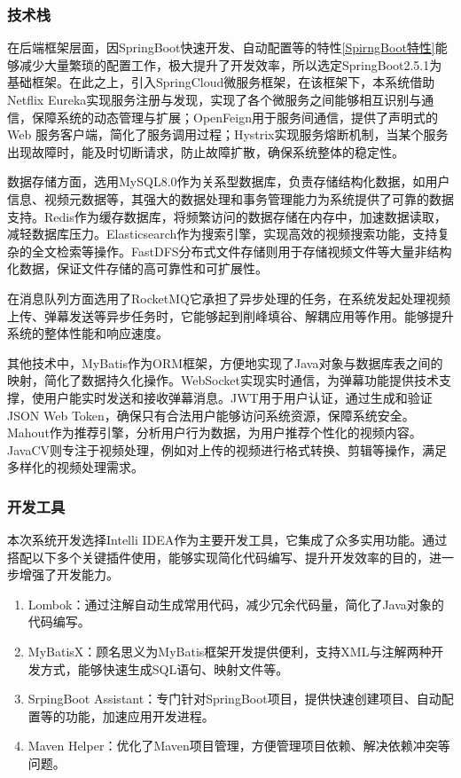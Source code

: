 \subsubsection{技术栈}

在后端框架层面，因SpringBoot快速开发、自动配置等的特性\ref{SpirngBoot特性}能够减少大量繁琐的配置工作，极大提升了开发效率，所以选定SpringBoot2.5.1为基础框架。在此之上，引入SpringCloud微服务框架，在该框架下，本系统借助Netflix Eureka实现服务注册与发现，实现了各个微服务之间能够相互识别与通信，保障系统的动态管理与扩展；OpenFeign用于服务间通信，提供了声明式的 Web 服务客户端，简化了服务调用过程；Hystrix实现服务熔断机制，当某个服务出现故障时，能及时切断请求，防止故障扩散，确保系统整体的稳定性。

数据存储方面，选用MySQL8.0作为关系型数据库，负责存储结构化数据，如用户信息、视频元数据等，其强大的数据处理和事务管理能力为系统提供了可靠的数据支持。Redis作为缓存数据库，将频繁访问的数据存储在内存中，加速数据读取，减轻数据库压力。Elasticsearch作为搜索引擎，实现高效的视频搜索功能，支持复杂的全文检索等操作。FastDFS分布式文件存储则用于存储视频文件等大量非结构化数据，保证文件存储的高可靠性和可扩展性。

在消息队列方面选用了RocketMQ它承担了异步处理的任务，在系统发起处理视频上传、弹幕发送等异步任务时，它能够起到削峰填谷、解耦应用等作用。能够提升系统的整体性能和响应速度。

其他技术中，MyBatis作为ORM框架，方便地实现了Java对象与数据库表之间的映射，简化了数据持久化操作。WebSocket实现实时通信，为弹幕功能提供技术支撑，使用户能实时发送和接收弹幕消息。JWT用于用户认证，通过生成和验证JSON Web Token，确保只有合法用户能够访问系统资源，保障系统安全。Mahout作为推荐引擎，分析用户行为数据，为用户推荐个性化的视频内容。JavaCV则专注于视频处理，例如对上传的视频进行格式转换、剪辑等操作，满足多样化的视频处理需求。

\subsubsection{开发工具}

本次系统开发选择Intelli IDEA作为主要开发工具，它集成了众多实用功能。通过搭配以下多个关键插件使用，能够实现简化代码编写、提升开发效率的目的，进一步增强了开发能力。
\begin{enumerate}[label=(\arabic*)]
    \item Lombok：通过注解自动生成常用代码，减少冗余代码量，简化了Java对象的代码编写。
    \item MyBatisX：顾名思义为MyBatis框架开发提供便利，支持XML与注解两种开发方式，能够快速生成SQL语句、映射文件等。
    \item SrpingBoot Assistant：专门针对SpringBoot项目，提供快速创建项目、自动配置等的功能，加速应用开发进程。
    \item Maven Helper：优化了Maven项目管理，方便管理项目依赖、解决依赖冲突等问题。
\end{enumerate}

